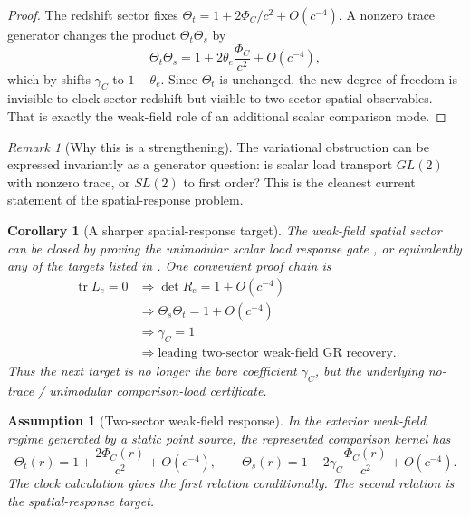 \documentclass[11pt]{article}
\newtheorem{corollary}[theorem]{Corollary}
\newtheorem{assumption}[theorem]{Assumption}
\theoremstyle{remark}
\newtheorem{remark}[theorem]{Remark}
\begin{document}
\begin{proof}
The redshift sector fixes \(\Theta_t=1+2\Phi_C/c^2+O(c^{-4})\).  A nonzero trace generator changes the product \(\Theta_t\Theta_s\) by
\[
        \Theta_t\Theta_s
        =1+2\theta_e\frac{\Phi_C}{c^2}+O(c^{-4}),
\]
which by  shifts \(\gamma_C\) to \(1-\theta_e\).  Since \(\Theta_t\) is unchanged, the new degree of freedom is invisible to clock-sector redshift but visible to two-sector spatial observables.  That is exactly the weak-field role of an additional scalar comparison mode.
\end{proof}

\begin{remark}[Why this is a strengthening]
The variational obstruction can be expressed invariantly as a generator question: is scalar load transport \(GL(2)\) with nonzero trace, or \(SL(2)\) to first order?  This is the cleanest current statement of the spatial-response problem.
\end{remark}

\begin{corollary}[A sharper spatial-response target]
\label{cor:sharper-target}
The weak-field spatial sector can be closed by proving the unimodular scalar load response gate , or equivalently any of the targets listed in .  One convenient proof chain is
\[
\begin{aligned}
        \operatorname{tr}L_e=0
        &\Longrightarrow
        \det R_e=1+O(c^{-4}) \\
        &\Longrightarrow
        \Theta_s\Theta_t=1+O(c^{-4}) \\
        &\Longrightarrow
        \gamma_C=1 \\
        &\Longrightarrow
        \text{leading two-sector weak-field GR recovery}.
\end{aligned}
\]
Thus the next target is no longer the bare coefficient \(\gamma_C\), but the underlying no-trace / unimodular comparison-load certificate.
\end{corollary}

\begin{assumption}[Two-sector weak-field response]
\label{ass:two-sector-response}
In the exterior weak-field regime generated by a static point source, the represented comparison kernel has
\[
        \Theta_t(r)=1+\frac{2\Phi_C(r)}{c^2}+O(c^{-4}),
        \qquad
        \Theta_s(r)=1-2\gamma_C\frac{\Phi_C(r)}{c^2}+O(c^{-4}).
\]
The clock calculation gives the first relation conditionally.  The second relation is the spatial-response target.
\end{assumption}
\end{document}
